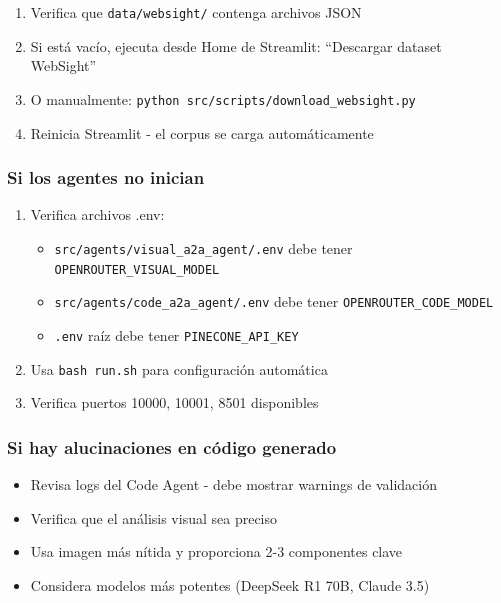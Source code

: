\documentclass[12pt,a4paper]{article}
\begin{document}
\begin{enumerate}
    \item Verifica que \texttt{data/websight/} contenga archivos JSON
    \item Si está vacío, ejecuta desde Home de Streamlit: ``Descargar dataset WebSight''
    \item O manualmente: \texttt{python src/scripts/download\_websight.py}
    \item Reinicia Streamlit - el corpus se carga automáticamente
\end{enumerate}

\subsubsection{Si los agentes no inician}

\begin{enumerate}
    \item Verifica archivos .env:
    \begin{itemize}
        \item \texttt{src/agents/visual\_a2a\_agent/.env} debe tener \texttt{OPENROUTER\_VISUAL\_MODEL}
        \item \texttt{src/agents/code\_a2a\_agent/.env} debe tener \texttt{OPENROUTER\_CODE\_MODEL}
        \item \texttt{.env} raíz debe tener \texttt{PINECONE\_API\_KEY}
    \end{itemize}
    \item Usa \texttt{bash run.sh} para configuración automática
    \item Verifica puertos 10000, 10001, 8501 disponibles
\end{enumerate}

\subsubsection{Si hay alucinaciones en código generado}

\begin{itemize}
    \item Revisa logs del Code Agent - debe mostrar warnings de validación
    \item Verifica que el análisis visual sea preciso
    \item Usa imagen más nítida y proporciona 2-3 componentes clave
    \item Considera modelos más potentes (DeepSeek R1 70B, Claude 3.5)
\end{itemize}
\end{document}
